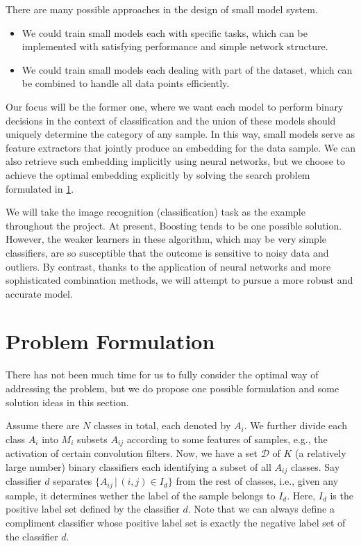 \documentclass[acmsmall,nonacm]{acmart}\settopmatter{}
\begin{document}
There are many possible approaches in the design of small model system.
\begin{itemize}
  \item We could train small models each with specific tasks, which can be implemented with satisfying performance and simple network structure.
  \item We could train small models each dealing with part of the dataset, which can be combined to handle all data points efficiently.
\end{itemize}
Our focus will be the former one, where we want each model to perform binary decisions in the context of classification and the union of these models should uniquely determine the category of any sample.
In this way, small models serve as feature extractors that jointly produce an embedding for the data sample.
We can also retrieve such embedding implicitly using neural networks, but we choose to achieve the optimal embedding explicitly by solving the search problem formulated in \cref{sec:formulation}.

We will take the image recognition (classification) task as the example throughout the project.
At present, Boosting\cite{Schapire1989The} tends to be one possible solution.
However, the weaker learners in these algorithm, which may be very simple classifiers, are so susceptible that the outcome is sensitive to noisy data and outliers.
By contrast, thanks to the application of neural networks and more sophisticated combination methods, we will attempt to pursue a more robust and accurate model.

\section{Problem Formulation}
\label{sec:formulation}
There has not been much time for us to fully consider the optimal way of addressing the problem, but we do propose one possible formulation and some solution ideas in this section.

Assume there are $N$ classes in total, each denoted by $A_i$.
We further divide each class $A_i$ into $M_i$ subsets $A_{ij}$ according to some features of samples, e.g., the activation of certain convolution filters.
Now, we have a set $\mathcal{D}$ of $K$ (a relatively large number) binary classifiers each identifying a subset of all $A_{ij}$ classes.
Say classifier $d$ separates $\{A_{ij} \,|\, (i, j) \in I_d\}$ from the rest of classes, i.e., given any sample, it determines wether the label of the sample belongs to $I_d$.
Here, $I_d$ is the positive label set defined by the classifier $d$.
Note that we can always define a compliment classifier whose positive label set is exactly the negative label set of the classifier $d$.
\end{document}
